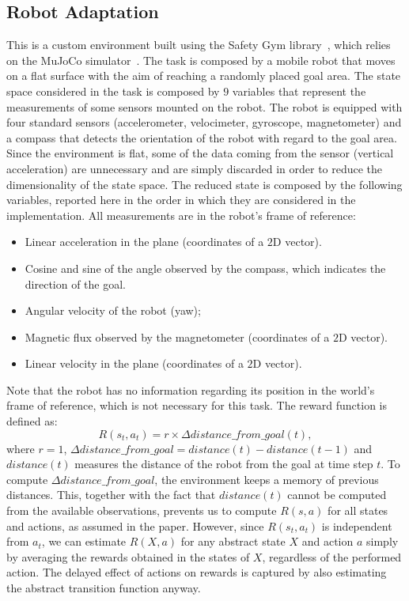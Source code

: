 \subsection{Robot Adaptation}\label{sec:robot}
This is a custom environment built using the Safety Gym library~\citep{ray2019benchmarking}, which relies on the MuJoCo simulator~\citep{todorov2012mujoco}. The task is composed by a mobile robot that moves on a flat surface with the aim of reaching a randomly placed goal area. The state space considered in the task is composed by $9$ variables that represent the measurements of some sensors mounted on the robot. The robot is equipped with four standard sensors (accelerometer, velocimeter, gyroscope, magnetometer) and a compass that detects the orientation of the robot with regard to the goal area. Since the environment is flat, some of the data coming from the sensor (\eg vertical acceleration) are unnecessary and are simply discarded in order to reduce the dimensionality of the state space. 
The reduced state is composed by the following variables, reported here in the order in which they are considered in the implementation. All measurements are in the robot's frame of reference:
\begin{itemize}
	\item Linear acceleration in the plane (coordinates of a $2$D vector).
	\item Cosine and sine of the angle observed by the compass, which indicates the direction of the goal.
	\item Angular velocity of the robot (\wrt yaw);
	\item Magnetic flux observed by the magnetometer (coordinates of a $2$D vector).
	\item Linear velocity in the plane (coordinates of a $2$D vector).
\end{itemize}
Note that the robot has no information regarding its position in the world's frame of reference, which is not necessary for this task.
The reward function is defined as:
\[ 
R(s_t, a_t) = r \times \Delta distance\_from\_goal(t),
\]
where $r=1$, $\Delta distance\_from\_goal = distance(t) - distance(t-1)$ and $distance(t)$ measures the distance of the robot from the goal at time step $t$.
To compute $\Delta distance\_from\_goal$, the environment keeps a memory of previous distances. This, together with the fact that $distance(t)$ cannot be computed from the available observations, prevents us to compute $R(s,a)$ for all states and actions, as assumed in the paper. However, since $R(s_t,a_t)$ is independent from $a_t$, we can estimate $R(X,a)$ for any abstract state $X$ and action $a$ simply by averaging the rewards obtained in the states of $X$, regardless of the performed action. The delayed effect of actions on rewards is captured by also estimating the abstract transition function anyway.


